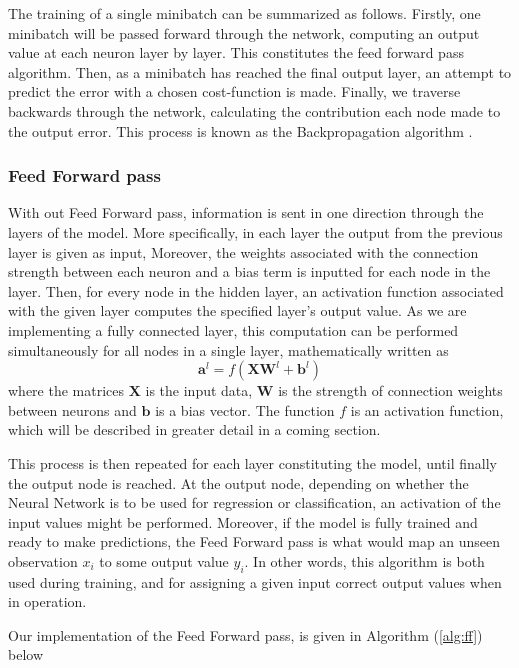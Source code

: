 \documentclass
[twocolumn,
secnumarabic,
nobibnotes,
aps,
prl,
reprint,
groupedaddress,
amsmath,
amssymb
]{revtex4-2}
\begin{document}
The training of a single minibatch can be summarized as follows.
Firstly, one minibatch will be passed forward through the network, computing an output value at each neuron layer by layer. This constitutes the feed forward pass algorithm. Then, as a minibatch has reached the final output layer, an attempt to predict the error with a chosen cost-function is made. Finally, we traverse backwards through the network, calculating the contribution each node made to the output error. This process is known as the Backpropagation algorithm \cite{Rumelhart1986}.

\subsubsection{Feed Forward pass}
With out Feed Forward pass, information is sent in one direction through the layers of the model. More specifically, in each layer the output from the previous layer is given as input, Moreover, the weights associated with the connection strength between each neuron and a bias term is inputted for each node in the layer. Then, for every node in the hidden layer, an activation function associated with the given layer computes the specified layer's output value. As we are implementing a fully connected layer, this computation can be performed simultaneously for all nodes in a single layer, mathematically written as
\begin{equation}
  \nonumber
  \bm{a}^l = f(\bm{XW}^l + \bm{b}^l)
\end{equation}
where the matrices $\bm{X}$ is the input data, $\bm{W}$ is the strength of connection weights between neurons and $\bm{b}$ is a bias vector. The function $f$ is an activation function, which will be described in greater detail in a coming section.

This process is then repeated for each layer constituting the model, until finally the output node is reached. At the output node, depending on whether the Neural Network is to be used for regression or classification, an activation of the input values might be performed. Moreover, if the model is fully trained and ready to make predictions, the Feed Forward pass is what would map an unseen observation $x_i$ to some output value $y_i$. In other words, this algorithm is both used during training, and for assigning a given input correct output values when in operation.

Our implementation of the Feed Forward pass, is given in Algorithm (\ref{alg:ff}) below
\end{document}
